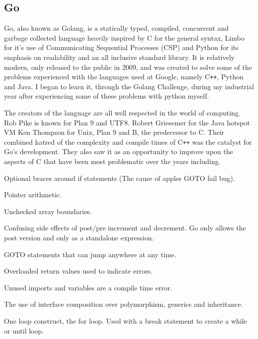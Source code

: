 \subsection{Go}

Go, also known as Golang, is a statically typed, compiled, concurrent and garbage collected language heavily inspired by C for the general syntax, Limbo for it's use of Communicating Sequential Processes (CSP)\cite{HOARE-CSP} and Python for its emphasis on readability and an all inclusive standard library.
It is relatively modern, only released to the public in 2009, and was created to solve some of the problems experienced with the languages used at Google, namely C\verb!++!, Python and Java.
I began to learn it, through the Golang Challenge\cite{GOLANG-CHALLENGE},  during my industrial year after experiencing some of these problems with python myself.

The creators of the language are all well respected in the world of computing.
Rob Pike is known for Plan 9 and UTF8. 
Robert Griesemer for the Java hotspot VM
Ken Thompson for Unix, Plan 9 and B, the predecessor to C.
Their combined hatred of the complexity and compile times of C\verb!++! was the catalyst for Go's development.
They also saw it as an opportunity to improve upon the aspects of C that have been most problematic over the years including\cite{GO-DESIGN-EMAIL}.

\begin{itemize*}
	\item Optional braces around if statements (The cause of apples GOTO fail bug\cite{GOTOFAIL}).
	\item Pointer arithmetic.
    \item Unchecked array boundaries.
	\item Confusing side effects of post/pre increment and decrement. Go only allows the post version and only as a standalone expression.
	\item GOTO statements that can jump anywhere at any time.
    \item Overloaded return values used to indicate errors.
    \item Unused imports and variables are a compile time error.
    \item The use of interface composition over polymorphism, generics and inheritance.
    \item One loop construct, the for loop. Used with a break statement to create a while or until loop.
\end{itemize*}

